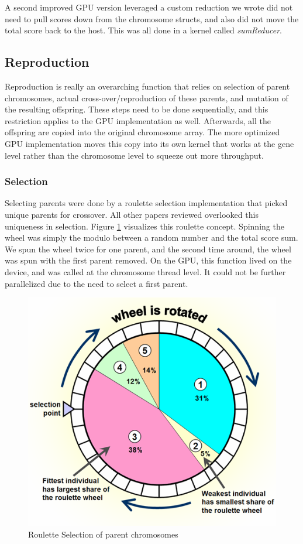 \documentclass[11pt]{article}       %
\begin{document}
A second improved GPU version leveraged a custom reduction we wrote did not need to pull scores down from the chromosome structs, and also did not move the total score back to the host. This was all done in a kernel called \textit{sumReducer}.

\subsection{Reproduction}
Reproduction is really an overarching function that relies on selection of parent chromosomes, actual cross-over/reproduction of these parents, and mutation of the resulting offspring. These steps need to be done sequentially, and this restriction applies to the GPU implementation as well. Afterwards, all the offspring are copied into the original chromosome array. The more optimized GPU implementation moves this copy into its own kernel that works at the gene level rather than the chromosome level to squeeze out more throughput.

\subsubsection{Selection}
Selecting parents were done by a roulette selection implementation that picked unique parents for crossover. All other papers reviewed overlooked this uniqueness in selection. Figure \ref{fig:roulette} visualizes this roulette concept. Spinning the wheel was simply the modulo between a random number and the total score sum. We spun the wheel twice for one parent, and the second time around, the wheel was spun with the first parent removed. On the GPU, this function lived on the device, and was called at the chromosome thread level. It could not be further parallelized due to the need to select a first parent.

\begin{figure}[h]
    \centering
    \includegraphics[width=0.5\linewidth]{Figures/roulette_selection.png}
    \caption{Roulette Selection of parent chromosomes}
    \label{fig:roulette}
\end{figure}
\end{document}
